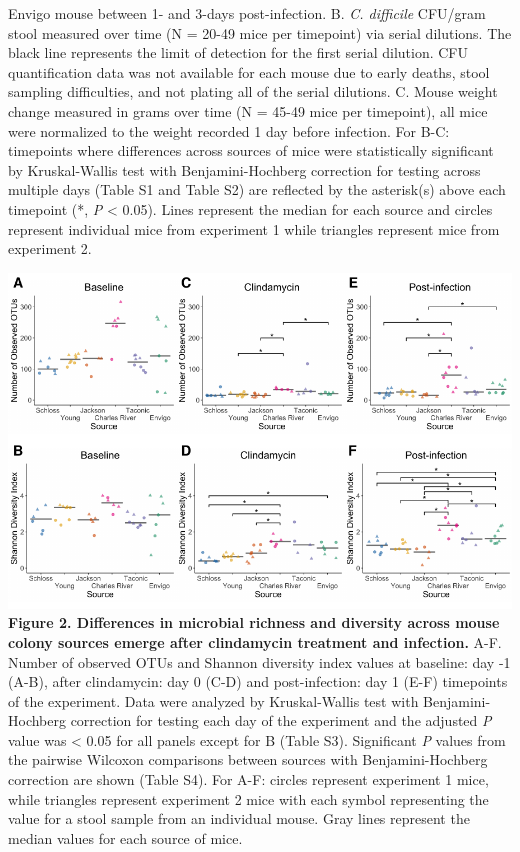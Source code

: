 \documentclass[11pt,]{article}
\begin{document}
Envigo mouse between 1- and 3-days post-infection. B. \emph{C.
difficile} CFU/gram stool measured over time (N = 20-49 mice per
timepoint) via serial dilutions. The black line represents the limit of
detection for the first serial dilution. CFU quantification data was not
available for each mouse due to early deaths, stool sampling
difficulties, and not plating all of the serial dilutions. C. Mouse
weight change measured in grams over time (N = 45-49 mice per
timepoint), all mice were normalized to the weight recorded 1 day before
infection. For B-C: timepoints where differences across sources of mice
were statistically significant by Kruskal-Wallis test with
Benjamini-Hochberg correction for testing across multiple days (Table S1
and Table S2) are reflected by the asterisk(s) above each timepoint (*,
\emph{P} \textless{} 0.05). Lines represent the median for each source
and circles represent individual mice from experiment 1 while triangles
represent mice from experiment 2.

\newpage

\includegraphics{figure_2.pdf} \textbf{Figure 2. Differences in
microbial richness and diversity across mouse colony sources emerge
after clindamycin treatment and infection.} A-F. Number of observed OTUs
and Shannon diversity index values at baseline: day -1 (A-B), after
clindamycin: day 0 (C-D) and post-infection: day 1 (E-F) timepoints of
the experiment. Data were analyzed by Kruskal-Wallis test with
Benjamini-Hochberg correction for testing each day of the experiment and
the adjusted \emph{P} value was \textless{} 0.05 for all panels except
for B (Table S3). Significant \emph{P} values from the pairwise Wilcoxon
comparisons between sources with Benjamini-Hochberg correction are shown
(Table S4). For A-F: circles represent experiment 1 mice, while
triangles represent experiment 2 mice with each symbol representing the
value for a stool sample from an individual mouse. Gray lines represent
the median values for each source of mice.
\end{document}
